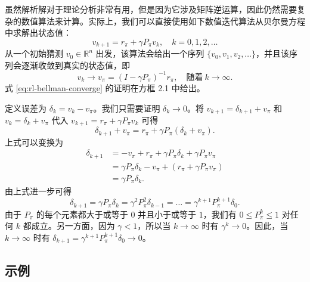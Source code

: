 虽然解析解对于理论分析非常有用，但是因为它涉及矩阵逆运算，因此仍然需要复杂的数值算法来计算。实际上，我们可以直接使用如下数值迭代算法从贝尔曼方程中求解出状态值：
\begin{equation}
v_{k+1} = r_\pi + \gamma P_\pi v_k, \quad k = 0, 1, 2, \ldots
\label{eq:rl-bellman-iterative}
\end{equation}
从一个初始猜测 $v_0 \in \mathbb{R}^n$ 出发，该算法会给出一个序列 $\{v_0, v_1, v_2, \ldots\}$，并且该序列会逐渐收敛到真实的状态值，即
\begin{equation}
v_k \to v_\pi = (I - \gamma P_\pi)^{-1} r_\pi, \quad \text{随着} \ k \to \infty .
\label{eq:rl-bellman-converge}
\end{equation}
式 \cref{eq:rl-bellman-converge} 的证明在方框 2.1 中给出。

\begin{derivation}
定义误差为 $\delta_k = v_k - v_\pi$。我们只需要证明 $\delta_k \to 0$。将 $v_{k+1} = \delta_{k+1} + v_\pi$ 和 $v_k = \delta_k + v_\pi$ 代入 $v_{k+1} = r_\pi + \gamma P_\pi v_k$ 可得
\begin{equation*}
\delta_{k+1} + v_\pi = r_\pi + \gamma P_\pi (\delta_k + v_\pi).
\end{equation*}
上式可以变换为
\begin{equation*}
\begin{aligned}
\delta_{k+1} &= -v_\pi + r_\pi + \gamma P_\pi \delta_k + \gamma P_\pi v_\pi \\
&= \gamma P_\pi \delta_k - v_\pi + (r_\pi + \gamma P_\pi v_\pi) \\
&= \gamma P_\pi \delta_k.
\end{aligned}
\end{equation*}
由上式进一步可得
\begin{equation*}
\delta_{k+1} = \gamma P_\pi \delta_k = \gamma^2 P_\pi^2 \delta_{k-1} = \dots = \gamma^{k+1} P_\pi^{k+1} \delta_0.
\end{equation*}
由于 $P_\pi$ 的每个元素都大于或等于 $0$ 并且小于或等于 $1$，我们有 $0 \leqslant P_\pi^k \leqslant 1$ 对任何 $k$ 都成立。另一方面，因为 $\gamma < 1$，所以当 $k \to \infty$ 时有 $\gamma^k \to 0$。因此，当 $k \to \infty$ 时有 $\delta_{k+1} = \gamma^{k+1} P_\pi^{k+1} \delta_0 \to 0$。
\end{derivation}

\subsection{示例}
\label{sec:rl-bellman-solve-examples}

